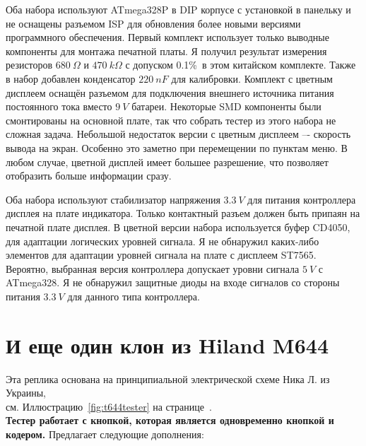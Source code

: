 Оба набора используют ATmega328P в DIP корпусе с установкой в панельку и
не оснащены разъемом ISP для обновления более новыми версиями программного обеспечения.
Первый комплект использует только выводные компоненты для монтажа печатной платы.
Я получил результат измерения резисторов \(680~\Omega\) и \(470~k\Omega\) с допуском 0.1\%\ в
этом китайском комплекте.
Также в набор добавлен конденсатор \(220~nF\) для калибровки.
Комплект с цветным дисплеем оснащён разъемом для подключения внешнего источника питания постоянного тока
вместо \(9~V\) батареи.
Некоторые SMD компоненты были смонтированы на основной плате, так что собрать тестер 
из этого набора не сложная задача.
Небольшой недостаток версии с цветным дисплеем –- скорость вывода на экран.
Особенно это заметно при  перемещении по пунктам меню.
В любом случае, цветной дисплей имеет большее разрешение, что позволяет отобразить больше информации сразу.

Оба набора используют стабилизатор напряжения \(3.3~V\) для питания контроллера
дисплея на плате индикатора.
Только контактный разъем должен быть припаян на печатной плате дисплея.
В цветной версии набора используется буфер CD4050, для адаптации логических уровней сигнала.
Я не обнаружил каких-либо элементов для адаптации уровней сигнала на плате с дисплеем ST7565.
Вероятно, выбранная версия контроллера допускает уровни сигнала \(5~V\) с ATmega328.
Я не обнаружил защитные диоды на входе сигналов со стороны питания \(3.3~V\) для данного типа контроллера.
\section{И еще один клон из Hiland M644}
\label{sec:hiland}
Эта реплика основана на принципиальной электрической схеме Ника Л. из Украины,
\\см. Иллюстрацию~\ref{fig:t644tester} на странице~\pageref{fig:t644tester}.\\
\textbf{ Тестер работает с кнопкой, которая является одновременно кнопкой и кодером.}
Предлагает следующие дополнения:

